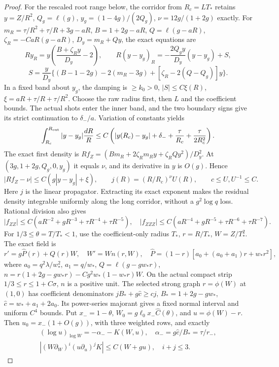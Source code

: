 \begin{proof}
For the rescaled root range below, the corridor from \(R_c=LT_*\) retains
\(y=Z/R^2\), \(Q_g=\ell(g)\),
\(y_g=(1-4g)/(2Q_g)\), \(\nu=12g/(1+2g)\) exactly.
For \(m_R=\tau/R^2+\tau/R+3g-aR\),
\(B=1+2g-aR\), \(Q=\ell(g-aR)\),
\(\zeta_R=-CaR(g-aR)\), \(D_y=m_R+Qy\), the exact equations are
\[
 R y_R=y\left(\frac{B+\zeta_Ry}{D_y}-2\right),\qquad
 R(y-y_g)_R=-\frac{2Q_gy}{D_y}(y-y_g)+S,
\]
\[
 S=\frac y{D_y}\{(B-1-2g)-2(m_R-3g)+
                                      [\zeta_R-2(Q-Q_g)]y\}.
\]
In a fixed band about \(y_g\), the damping is \(\ge k_0>0\),
\(|S|\le C\xi(R)\), \(\xi=aR+\tau/R+\tau/R^2\).
Choose the raw radius first, then \(L\) and the coefficient bounds.
The actual shots enter the inner band, and the two boundary signs give
its strict continuation to \(\delta_-/a\). Variation of constants yields
\[
 \int_{R_c}^{R_{\rm out}}|y-y_g|\frac{dR}{R}
 \le C\left(|y(R_c)-y_g|+\delta_-+\frac\tau{R_c}
                                      +\frac\tau{2R_c^2}\right).
\]
The exact first density is
\(Rf_Z=(Bm_R+2\zeta_Rm_Ry+\zeta_RQy^2)/D_y^2\).
At \((3g,1+2g,Q_g,0,y_g)\) it equals \(\nu\), and its derivative
in \(y\) is \(O(g)\). Hence
\[
 |Rf_Z-\nu|\le C(g|y-y_g|+\xi),\qquad
 j(R)=(R/R_c)^\nu U(R),\qquad c\le U,U^{-1}\le C.
\]
Here \(j\) is the linear propagator. Extracting its exact exponent makes the residual density integrable
uniformly along the long corridor, without a \(g^2\log q\) loss.
Rational division also gives
\[
 |f_{ZZ}|\le C(aR^{-2}+gR^{-3}+\tau R^{-4}+\tau R^{-5}),\quad
 |f_{ZZZ}|\le C(aR^{-4}+gR^{-5}+\tau R^{-6}+\tau R^{-7}).
\]
For \(1/3\le\theta=T/T_*<1\), use the coefficient-only radius
\(T_*\), \(r=R/T_*\), \(W=Z/T_*^2\). The exact field is
\[
 r'=g\widehat P(r)+Q(r)W,\quad W'=Wn(r,W),\quad
 \widehat P=(1-r)[a_0+(a_0+a_1)r+w_*r^2],
\]
where \(a_0=q^2\lambda/w_*^2\), \(a_1=q/w_*\),
\(Q=\ell(g-gw_*r)\),
\(n=r(1+2g-gw_*r)-Cg^2w_*(1-w_*r)W\).
On the actual compact strip \(1/3\le r\le1+C\sigma\), \(n\) is a
positive unit. The selected strong graph \(r=\phi(W)\) at \((1,0)\)
has coefficient denominators
\(jB_*+g\widehat c\ge cj\),
\(B_*=1+2g-gw_*\), \(\widehat c=w_*+a_1+2a_0\).
Its power-series majorant gives a fixed normal interval and uniform
\(C^4\) bounds. Put \(x_-=1-\theta\),
\(W_0=g\ell_0x_-\widehat C(\theta)\), and \(u=\phi(W)-r\).
Then \(u_0=x_-(1+O(g))\), with three weighted rows, and exactly
\[
 \begin{gathered}
 (\log u)_{\log W}=-\alpha_--K(W,u),\quad
 \alpha_-=g\widehat c/B_* =\tau/r_-,\\
 |(W\partial_W)^i(u\partial_u)^jK|\le C(W+gu),\quad i+j\le3.
 \end{gathered}
\]
\end{proof}
